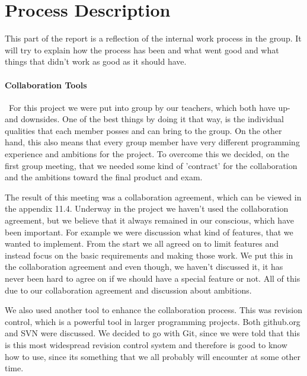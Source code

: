 \documentclass[a4paper,10pt,titlepage]{article}
\begin{document}
		\newpage

	\section{Process Description}
	This part of the report is a reflection of the internal work process in the group. It will try to explain how the process has been and what went good and what things that didn't work as good as it should have.
	
	\paragraph{Collaboration Tools}\mbox{}\
	For this project we were put into group by our teachers, which both have up- and downsides. One of the best things by doing it that way, is the individual qualities that each member posses and can bring to the group. On the other hand, this also means that every group member have very different programming experience and ambitions for the project. To overcome this we decided, on the first group meeting, that we needed some kind of 'contract' for the collaboration and the ambitions toward the final product and exam.

 The result of this meeting was a collaboration agreement, which can be viewed in the appendix 11.4. Underway in the project we haven't used the collaboration agreement, but we believe that it always remained in our conscious, which have been important. For example we were discussion what kind of features, that we wanted to implement. From the start we all agreed on to limit features and instead focus on the basic requirements and making those work. We put this in the collaboration agreement and even though, we haven't discussed it, it has never been hard to agree on if we should have a special feature or not. All of this due to our collaboration agreement and discussion about ambitions.

		We also used another tool to enhance the collaboration process. This was revision control, which is a powerful tool in larger programming projects. Both github.org and SVN were discussed. We decided to go with Git, since we were told that this is this most widespread revision control system and therefore is good to know how to use, since its something that we all probably will encounter at some other time.
\end{document}

